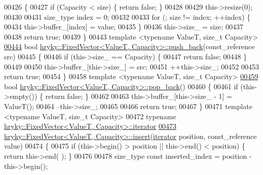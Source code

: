 \begin{DoxyCode}
00426 \{
00427     \textcolor{keywordflow}{if} (Capacity < size) \{ \textcolor{keywordflow}{return} \textcolor{keyword}{false}; \}
00428 
00429     this->resize(0);
00430 
00431     size\_type index = 0;
00432 
00433     \textcolor{keywordflow}{for} (; size != index; ++index) \{
00434         this->buffer\_[index] = value;
00435     \}
00436     this->size\_ = size;
00437 
00438     \textcolor{keywordflow}{return} \textcolor{keyword}{true};
00439 \}
00443 \textcolor{keyword}{template} <\textcolor{keyword}{typename} ValueT, \textcolor{keywordtype}{size\_t} Capacity>
\hypertarget{fixed__vector_8h_source_l00444}{}\hyperlink{classhryky_1_1_fixed_vector_abbe51e93d13aaed72485a62ee0163bc8}{00444} \textcolor{keywordtype}{bool} \hyperlink{classhryky_1_1_fixed_vector}{hryky::FixedVector<ValueT, Capacity>::push_back}(const\_reference src)
00445 \{
00446     \textcolor{keywordflow}{if} (this->size\_ == Capacity) \{
00447         \textcolor{keywordflow}{return} \textcolor{keyword}{false};
00448     \}
00449 
00450     this->buffer\_[this->size\_] = src;
00451     ++this->size\_;
00452 
00453     \textcolor{keywordflow}{return} \textcolor{keyword}{true};
00454 \}
00458 \textcolor{keyword}{template} <\textcolor{keyword}{typename} ValueT, \textcolor{keywordtype}{size\_t} Capacity>
\hypertarget{fixed__vector_8h_source_l00459}{}\hyperlink{classhryky_1_1_fixed_vector_a67a4b8f465184732e190a2748876e3e8}{00459} \textcolor{keywordtype}{bool} \hyperlink{classhryky_1_1_fixed_vector}{hryky::FixedVector<ValueT, Capacity>::pop_back}()
00460 \{
00461     \textcolor{keywordflow}{if} (this->empty()) \{ \textcolor{keywordflow}{return} \textcolor{keyword}{false}; \}
00462 
00463     this->buffer\_[this->size\_ - 1] = ValueT();
00464     --this->size\_;
00465 
00466     \textcolor{keywordflow}{return} \textcolor{keyword}{true};
00467 \}
00471 \textcolor{keyword}{template} <\textcolor{keyword}{typename} ValueT, \textcolor{keywordtype}{size\_t} Capacity>
00472 \textcolor{keyword}{typename} \hyperlink{classhryky_1_1iterator_1_1random_1_1_mutable}{hryky::FixedVector<ValueT, Capacity>::iterator}
\hypertarget{fixed__vector_8h_source_l00473}{}\hyperlink{classhryky_1_1_fixed_vector_a8fb930253e5023e26863dbb41be7a955}{00473} \hyperlink{classhryky_1_1_fixed_vector}{hryky::FixedVector<ValueT, Capacity>::insert}(\hyperlink{classhryky_1_1iterator_1_1random_1_1_mutable}{iterator} position, const\_reference
       value)
00474 \{
00475     \textcolor{keywordflow}{if} (this->begin() > position || this->end() < position) \{ \textcolor{keywordflow}{return} this->end(
      ); \}
00476 
00478     size\_type \textcolor{keyword}{const} inserted\_index = position - this->begin();

\end{DoxyCode}

